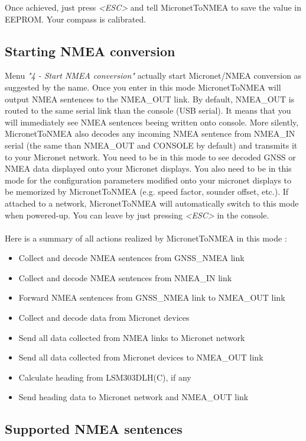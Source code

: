 \documentclass{report}
\begin{document}
Once achieved, just press \emph{<ESC>} and tell MicronetToNMEA to save the value in EEPROM. Your compass is calibrated.

\subsection{Starting NMEA conversion}

Menu \emph{"4 - Start NMEA conversion"} actually start Micronet/NMEA conversion as suggested by the name. Once you enter in this mode MicronetToNMEA will output NMEA sentences to the NMEA\_OUT link. By default, NMEA\_OUT is routed to the same serial link than the console (USB serial). It means that you will immediately see NMEA sentences beeing written onto console. More silently, MicronetToNMEA also decodes any incoming NMEA sentence from NMEA\_IN serial (the same than NMEA\_OUT and CONSOLE by default) and transmits it to your Micronet network.
You need to be in this mode to see decoded GNSS or NMEA data displayed onto your Micronet displays. You also need to be in this mode for the configuration parameters modified onto your micronet displays to be memorized by MicronetToNMEA (e.g. speed factor, sounder offset, etc.).
If attached to a network, MicronetToNMEA will automatically switch to this mode when powered-up. You can leave by just pressing \emph{<ESC>} in the console.
\\
\\
Here is a summary of all actions realized by MicronetToNMEA in this mode :
\begin{itemize}
	\item Collect and decode NMEA sentences from GNSS\_NMEA link
	\item Collect and decode NMEA sentences from NMEA\_IN link
	\item Forward NMEA sentences from GNSS\_NMEA link to NMEA\_OUT link
	\item Collect and decode data from Micronet devices
	\item Send all data collected from NMEA links to Micronet network
	\item Send all data collected from Micronet devices to NMEA\_OUT link
	\item Calculate heading from LSM303DLH(C), if any
	\item Send heading data to Micronet network and NMEA\_OUT link
\end{itemize}

\subsection{Supported NMEA sentences}
\end{document}
